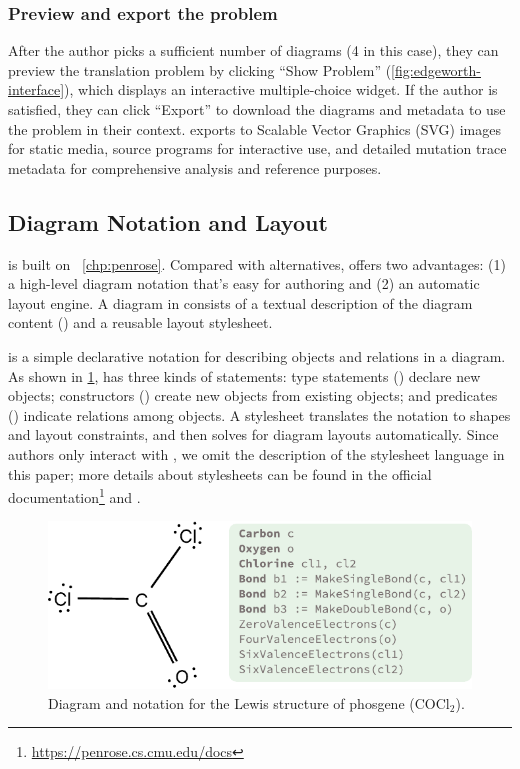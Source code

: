 \subsubsection{Preview and export the problem}
After the author picks a sufficient number of diagrams (4 in this case), they can preview the translation problem by clicking ``Show Problem'' (\cref{fig:edgeworth-interface}), which displays an interactive multiple-choice widget. If the author is satisfied, they can click ``Export'' to download the diagrams and metadata to use the problem in their context. \Edgeworth exports to Scalable Vector Graphics (SVG) images for static media, source programs for interactive use, and detailed mutation trace metadata for comprehensive analysis and reference purposes.

\subsection{Diagram Notation and Layout}
\label{sec:edgeworth-layout}

\Edgeworth is built on \Penrose~\cref{chp:penrose}. Compared with alternatives, \Penrose offers two advantages: (1) a high-level diagram notation that's easy for authoring and (2) an automatic layout engine. A diagram in \Penrose consists of a textual description of the diagram content (\Substance) and a reusable layout stylesheet. 

\Substance is a simple declarative notation for describing objects and relations in a diagram. As shown in \cref{fig:cocl2-example}, \Substance has three kinds of statements: type statements (\eg {}) declare new objects; constructors () create new objects from existing objects; and predicates () indicate relations among objects. A stylesheet translates the \Substance notation to shapes and layout constraints, and then \Penrose solves for diagram layouts automatically. Since \Edgeworth authors only interact with \Substance, we omit the description of the stylesheet language in this paper; more details about stylesheets can be found in the official documentation\footnote{\url{https://penrose.cs.cmu.edu/docs}} and \citet{penrose}.

\begin{figure}[H]
    \centering
    \includegraphics[width=.6\linewidth]{assets/chapter-3/cocl2-example.pdf}
    \caption{\textmd{Diagram and \Substance notation for the Lewis structure of phosgene (\ensuremath{\mathrm{COCl_2}}).}}
    \label{fig:cocl2-example}
\end{figure}


